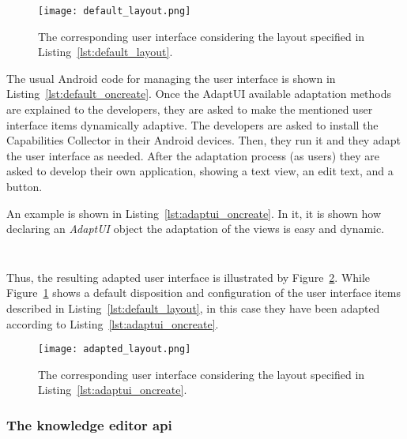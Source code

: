 \inputminted[linenos=true, fontsize=\footnotesize, frame=lines]{xml}{5_experiments_and_results/default_layout.xml}

\begin{figure}
\centering
\texttt{[image: default\_layout.png]}
\caption{The corresponding user interface considering the layout specified in
Listing~\ref{lst:default_layout}.}
\label{fig:default_layout}
\end{figure}

The usual Android code for managing the user interface is shown in Listing~\ref{lst:default_oncreate}.
Once the AdaptUI available adaptation methods are explained to the developers,
they are asked to make the mentioned user interface items dynamically adaptive.
The developers are asked to install the Capabilities Collector in their Android
devices. Then, they run it and they adapt the user interface as needed. After
the adaptation process (as users) they are asked to develop their own application,
showing a text view, an edit text, and a button. 

An example is shown in Listing~\ref{lst:adaptui_oncreate}. In it, it is shown 
how declaring an \textit{AdaptUI} object the adaptation of the views is easy and 
dynamic.

\inputminted[linenos=true, fontsize=\footnotesize, frame=lines]{java}{5_experiments_and_results/default_oncreate.java}

\inputminted[linenos=true, fontsize=\footnotesize, frame=lines]{java}{5_experiments_and_results/adaptui_oncreate.java}

Thus, the resulting adapted user interface is illustrated by Figure~\ref{fig:adapted_layout}.
While Figure~\ref{fig:default_layout} shows a default disposition and configuration
of the user interface items described in Listing~\ref{lst:default_layout}, in this
case they have been adapted according to Listing~\ref{lst:adaptui_oncreate}.

\begin{figure}
\centering
\texttt{[image: adapted\_layout.png]}
\caption{The corresponding user interface considering the layout specified in
Listing~\ref{lst:adaptui_oncreate}.}
\label{fig:adapted_layout}
\end{figure}

\subsubsection{The knowledge editor \ac{api}}
\label{sec:knowledge_api}